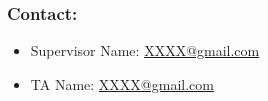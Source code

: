 \documentclass{article}
\begin{document}
\subsubsection*{Contact:}
\begin{itemize}
    \item Supervisor Name: \href{mailto:XXX@gmail.com}{XXXX@gmail.com} 
    \item TA Name: \href{mailto:XXX@gmail.com}{XXXX@gmail.com} 
\end{itemize}

%
%
\end{document}
